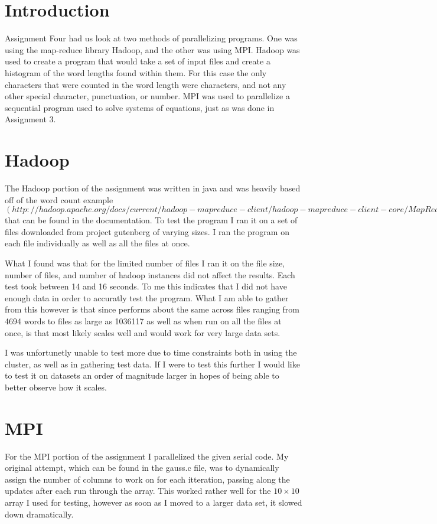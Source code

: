\documentclass[12pt]{article}
\begin{document}
\maketitle

\section*{Introduction}
Assignment Four had us look at two methods of parallelizing programs. One was using
the map-reduce library Hadoop, and the other was using MPI. Hadoop was used to create
a program that would take a set of input files and create a histogram of the word lengths
found within them. For this case the only characters that were counted in the word length
were characters, and not any other special character, punctuation, or number. MPI was used
to parallelize a sequential program used to solve systems of equations, just as was done in
Assignment 3.

\section*{Hadoop}
The Hadoop portion of the assignment was written in java and was heavily based off of
the word count example $(http://hadoop.apache.org/docs/current/hadoop-mapreduce-client/hadoop-mapreduce-client-core/MapReduceTutorial.html)$
that can be found in the documentation. To test the program I ran it on a set of
files downloaded from project gutenberg of varying sizes. I ran the program on each file
individually as well as all the files at once.

What I found was that for the limited number of files I ran it on the file size, number of files,
and number of hadoop instances did not affect the results. Each test took between 14 and 16 seconds.
To me this indicates that I did not have enough data in order to accuratly test the program. What I am
able to gather from this however is that since performs about the same across files ranging from 4694 words to
files as large as 1036117 as well as when run on all the files at once, is that most
likely scales well and would work for very large data sets.

I was unfortunetly unable to test more due to time constraints both in using the cluster, as well as in gathering
test data. If I were to test this further I would like to test it on datasets an order of magnitude larger
in hopes of being able to better observe how it scales.

\section*{MPI}
For the MPI portion of the assignment I parallelized the given serial code. My original attempt, which can be
found in the gauss.c file, was to dynamically assign the number of columns to work on for each itteration,
passing along the updates after each run through the array. This worked rather well for the $10 \times 10$ array
I used for testing, however as soon as I moved to a larger data set, it slowed down dramatically.
\end{document}
